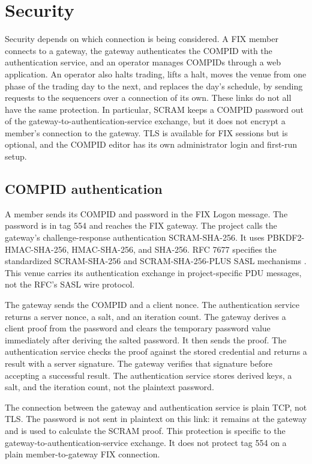 \chapter{Security}
\label{ch:security}

Security depends on which connection is being considered. A FIX member connects
to a gateway, the gateway authenticates the COMPID with the authentication
service, and an operator manages COMPIDs through a web application. An operator
also halts trading, lifts a halt, moves the venue from one phase of the
trading day to the next, and replaces the day's schedule, by sending requests
to the sequencers over a connection of its own. These links do not all have the same protection. In particular, SCRAM keeps a COMPID
password out of the gateway-to-authentication-service exchange, but it does not
encrypt a member's connection to the gateway. TLS is available for FIX sessions
but is optional, and the COMPID editor has its own administrator login and
first-run setup.

\section{COMPID authentication}
\label{sec:security:compid_authentication}

A member sends its COMPID and password in the FIX Logon message. The password
is in tag 554 and reaches the FIX gateway. The project calls the gateway's
challenge-response authentication SCRAM-SHA-256. It uses PBKDF2-HMAC-SHA-256,
HMAC-SHA-256, and SHA-256. RFC 7677 specifies the standardized SCRAM-SHA-256
and SCRAM-SHA-256-PLUS SASL mechanisms \cite{rfc7677}. This venue carries its
authentication exchange in project-specific PDU messages, not the RFC's SASL
wire protocol.

The gateway sends the COMPID and a client nonce. The authentication service
returns a server nonce, a salt, and an iteration count. The gateway derives a
client proof from the password and clears the temporary password value
immediately after deriving the salted password. It then sends the proof.
The authentication service checks the proof against the stored
credential and returns a result with a server signature. The gateway verifies
that signature before accepting a successful result. The authentication
service stores derived keys, a salt, and the iteration count, not the
plaintext password.

The connection between the gateway and authentication service is plain TCP,
not TLS. The password is not sent in plaintext on this link: it remains at the
gateway and is used to calculate the SCRAM proof. This protection is specific
to the gateway-to-authentication-service exchange. It does not protect tag 554
on a plain member-to-gateway FIX connection.

